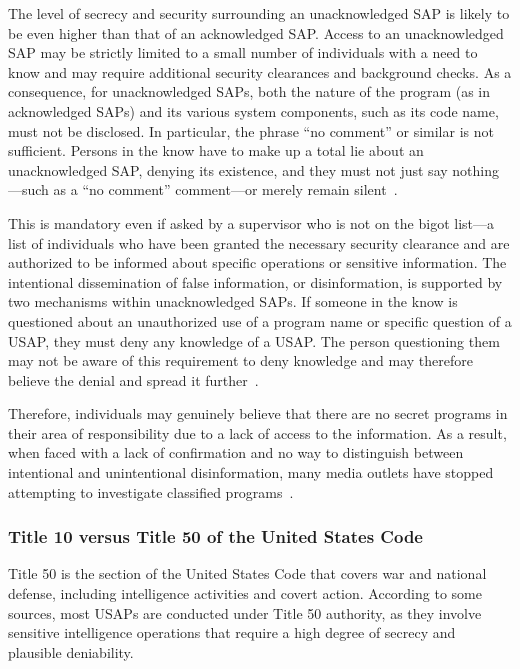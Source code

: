The level of secrecy and security surrounding an unacknowledged SAP is likely to be even higher than that of an acknowledged SAP. Access to an unacknowledged SAP may be strictly limited to a small number of individuals with a need to know and may require additional security clearances and background checks. As a consequence, for unacknowledged SAPs, both the nature of the program (as in acknowledged SAPs) and its various system components, such as its code name, must not be disclosed. In particular, the phrase ``no comment'' or similar is not sufficient. Persons in the know have to make up a total lie about an unacknowledged SAP, denying its existence, and they must not just say nothing---such as a ``no comment'' comment---or merely remain silent~\cite{Dolan-MrX-Disclosure2020Jul}.

This is mandatory even if asked by a supervisor who is not on the bigot list---a list of individuals who have been granted the necessary security clearance and are authorized to be informed about specific operations or sensitive information. The intentional dissemination of false information, or disinformation, is supported by two mechanisms within unacknowledged SAPs. If someone in the know is questioned about an unauthorized use of a program name or specific question of a USAP, they must deny any knowledge of a USAP. The person questioning them may not be aware of this requirement to deny knowledge and may therefore believe the denial and spread it further~\cite{Sweetman2000}.

Therefore, individuals may genuinely believe that there are no secret programs in their area of responsibility due to a lack of access to the information. As a result, when faced with a lack of confirmation and no way to distinguish between intentional and unintentional disinformation, many media outlets have stopped attempting to investigate classified programs~\cite{Sweetman2000}.


\subsubsection{Title 10 versus Title 50 of the United States Code}
\label{2023-UFO-part-Perception-crash-retreivals--t1v50}

Title 50 is the section of the United States Code that covers war and national defense,
including intelligence activities and covert action.
According to some sources, most USAPs are conducted under Title 50 authority,
as they involve sensitive intelligence operations that require a high degree of secrecy and plausible deniability.

